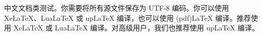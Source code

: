 \documentclass[UTF8]{ctexbook}
\begin{document}
中文文档类测试。你需要将所有源文件保存为 UTF-8 编码。你可以使用 XeLaTeX、LuaLaTeX 或 upLaTeX 编译，也可以使用 (pdf)LaTeX 编译。推荐使用 XeLaTeX 或 LuaLaTeX 编译。对高级用户，我们也推荐使用 upLaTeX 编译。
\end{document}
